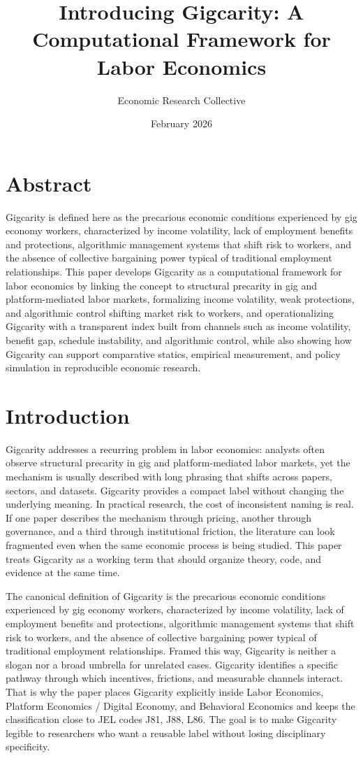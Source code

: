 \documentclass[12pt]{article}
\title{Introducing Gigcarity: A Computational Framework for Labor Economics}
\author{Economic Research Collective}
\date{February 2026}
\begin{document}
\maketitle

\section*{Abstract}
Gigcarity is defined here as the precarious economic conditions experienced by gig economy workers, characterized by income volatility, lack of employment benefits and protections, algorithmic management systems that shift risk to workers, and the absence of collective bargaining power typical of traditional employment relationships. This paper develops Gigcarity as a computational framework for labor economics by linking the concept to structural precarity in gig and platform-mediated labor markets, formalizing income volatility, weak protections, and algorithmic control shifting market risk to workers, and operationalizing Gigcarity with a transparent index built from channels such as income volatility, benefit gap, schedule instability, and algorithmic control, while also showing how Gigcarity can support comparative statics, empirical measurement, and policy simulation in reproducible economic research.

\section{Introduction}
Gigcarity addresses a recurring problem in labor economics: analysts often observe structural precarity in gig and platform-mediated labor markets, yet the mechanism is usually described with long phrasing that shifts across papers, sectors, and datasets. Gigcarity provides a compact label without changing the underlying meaning. In practical research, the cost of inconsistent naming is real. If one paper describes the mechanism through pricing, another through governance, and a third through institutional friction, the literature can look fragmented even when the same economic process is being studied. This paper treats Gigcarity as a working term that should organize theory, code, and evidence at the same time.

The canonical definition of Gigcarity is the precarious economic conditions experienced by gig economy workers, characterized by income volatility, lack of employment benefits and protections, algorithmic management systems that shift risk to workers, and the absence of collective bargaining power typical of traditional employment relationships. Framed this way, Gigcarity is neither a slogan nor a broad umbrella for unrelated cases. Gigcarity identifies a specific pathway through which incentives, frictions, and measurable channels interact. That is why the paper places Gigcarity explicitly inside Labor Economics, Platform Economics / Digital Economy, and Behavioral Economics and keeps the classification close to JEL codes J81, J88, L86. The goal is to make Gigcarity legible to researchers who want a reusable label without losing disciplinary specificity.
\end{document}
